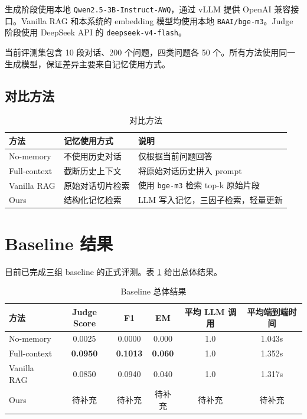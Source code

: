 \documentclass[UTF8,a4paper,11pt]{ctexart}
\begin{document}
生成阶段使用本地 \texttt{Qwen2.5-3B-Instruct-AWQ}，通过 vLLM 提供 OpenAI 兼容接口。Vanilla RAG 和本系统的 embedding 模型均使用本地 \texttt{BAAI/bge-m3}。Judge 阶段使用 DeepSeek API 的 \texttt{deepseek-v4-flash}。

当前评测集包含 10 段对话、200 个问题，四类问题各 50 个。所有方法使用同一生成模型，保证差异主要来自记忆使用方式。

\subsection{对比方法}

\begin{table}[H]
\centering
\caption{对比方法}
\begin{tabular}{lll}
\toprule
方法 & 记忆使用方式 & 说明 \\
\midrule
No-memory & 不使用历史对话 & 仅根据当前问题回答 \\
Full-context & 截断历史上下文 & 将原始对话历史拼入 prompt \\
Vanilla RAG & 原始对话切片检索 & 使用 \texttt{bge-m3} 检索 top-k 原始片段 \\
Ours & 结构化记忆检索 & LLM 写入记忆，三因子检索，轻量更新 \\
\bottomrule
\end{tabular}
\end{table}

\section{Baseline 结果}

目前已完成三组 baseline 的正式评测。表 \ref{tab:baseline-main} 给出总体结果。

\begin{table}[H]
\centering
\caption{Baseline 总体结果}
\label{tab:baseline-main}
\begin{tabular}{lccccc}
\toprule
方法 & Judge Score & F1 & EM & 平均 LLM 调用 & 平均端到端时间 \\
\midrule
No-memory & 0.0025 & 0.0000 & 0.000 & 1.0 & 1.043s \\
Full-context & \textbf{0.0950} & \textbf{0.1013} & \textbf{0.060} & 1.0 & 1.352s \\
Vanilla RAG & 0.0850 & 0.0940 & 0.040 & 1.0 & 1.317s \\
Ours & 待补充 & 待补充 & 待补充 & 待补充 & 待补充 \\
\bottomrule
\end{tabular}
\end{table}
\end{document}
